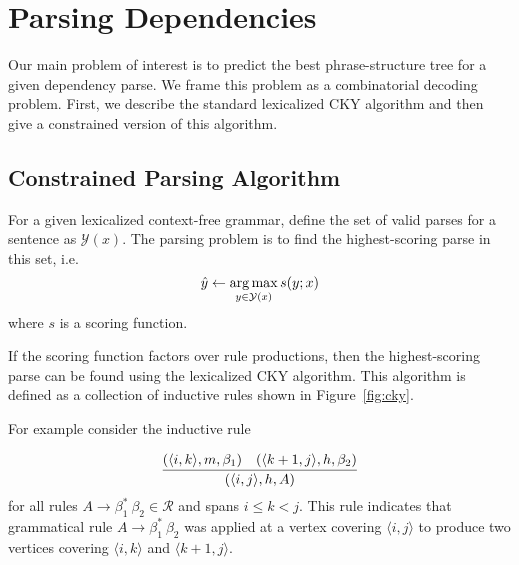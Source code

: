 \documentclass[11pt,letterpaper]{article}
\DeclareMathOperator*{\argmax}{arg\,max}
\newcommand{\rules}{\mathcal{R}}
\newcommand{\Span}[1]{\langle #1 \rangle}
\newcommand{\Rule}[3]{#1 \rightarrow #2\ #3}
\newcommand{\RuleA}[3]{#1 \rightarrow #2^*\ #3}
\begin{document}






\section{Parsing Dependencies}

Our main problem of interest is to predict the best
phrase-structure tree for a given dependency parse.
We frame this problem as a combinatorial decoding problem.
First, we describe the standard lexicalized CKY algorithm
and then give a constrained version of this algorithm.






\subsection{Constrained Parsing Algorithm}


For a given lexicalized context-free grammar,
define the set of valid parses for a sentence as $\mathcal{Y}(x)$.
The parsing problem is to find the highest-scoring parse in this set, i.e.  \[ \hat{y} \gets \argmax_{y \in {\cal Y}(x)} s(y;x) \] where
$s$ is a scoring function.

If the scoring function factors over rule productions, then
the highest-scoring parse can be found using the lexicalized
CKY algorithm. This algorithm is defined as a
collection of inductive rules shown in Figure~\ref{fig:cky}.

For example consider the inductive rule

\[ \infer{(\Span{i, j}, h, A)}{(\Span{i, k}, m, \beta_1) &  (\Span{k+1, j}, h, \beta_2)} \]
 for all rules $\RuleA{A}{\beta_1}{\beta_2}\in \rules$ and spans $i \leq k < j$. This rule indicates that grammatical rule $\RuleA{A}{\beta_1}{\beta_2}$  was applied at a vertex covering $\Span{i, j}$ to produce two vertices covering $\Span{i, k}$ and $\Span{k+1, j}$.
\end{document}
